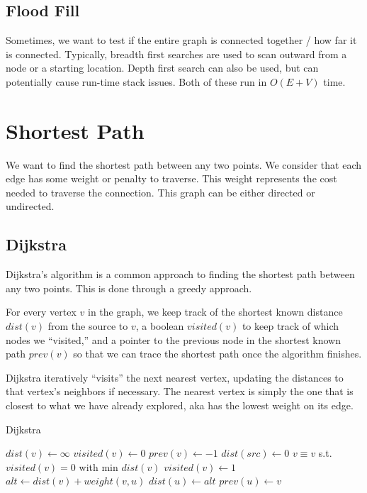 \documentclass{article}
\begin{document}
\subsection{Flood Fill}

Sometimes, we want to test if the entire graph is connected together / how far it is connected. Typically, breadth first searches are used to scan outward from a node or a starting location. Depth first search can also be used, but can potentially cause run-time stack issues. Both of these run in $O(E+V)$ time.

\section{Shortest Path}

We want to find the shortest path between any two points. We consider that each edge has some weight or penalty to traverse. This weight represents the cost needed to traverse the connection. This graph can be either directed or undirected.

\subsection{Dijkstra}

Dijkstra's algorithm is a common approach to finding the shortest path between any two points. This is done through a greedy approach. 

For every vertex $v$ in the graph, we keep track of the shortest known distance $dist(v)$ from the source to $v$, a boolean $visited(v)$ to keep track of which nodes we ``visited,'' and a pointer to the previous node in the shortest known path $prev(v)$ so that we can trace the shortest path once the algorithm finishes.

Dijkstra iteratively ``visits'' the next nearest vertex, updating the distances to that vertex's neighbors if necessary. The nearest vertex is simply the one that is closest to what we have already explored, aka has the lowest weight on its edge.

\begin{algorithm}[H]
\caption{Dijkstra}
\begin{algorithmic}
	\State $dist(v) \gets \infty$
	\State $visited(v) \gets 0$
    \State $prev(v) \gets -1$
\EndFor
\State $dist(src) \gets 0$
	\State $v \equiv v$ s.t. $visited(v)=0$ with min $dist(v)$
    \State $visited(v) \gets 1$
    		\State $alt \gets dist(v) + weight(v, u)$
				\State $dist(u) \gets alt$
   	        	\State $prev(u) \gets v$
			\EndIf
        \EndIf
    \EndFor
\EndWhile
\end{algorithmic}
\end{algorithm}
\end{document}
